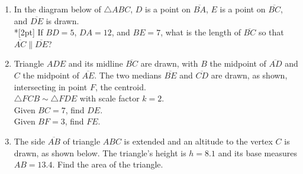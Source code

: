 \documentclass[12pt, twoside]{article}
\begin{document}
\begin{enumerate}
\newpage
  \item In the diagram below of $\triangle ABC$, $D$ is a point on $\overline{BA}$, $E$ is a point on $\overline{BC}$, and $\overline{DE}$ is drawn. \\*[2pt] 
  If $BD=5$, $DA=12$, and $BE=7$, what is the length of $\overline{BC}$ so that $\overline{AC} \parallel \overline{DE}$?
  \begin{flushright}
    \end{flushright} \vspace{1cm}
  
  \item Triangle $ADE$ and its midline $\overline{BC}$ are drawn, with $B$ the midpoint of $\overline{AD}$ and $C$ the midpoint of $\overline{AE}$. The two medians $\overline{BE}$ and $\overline{CD}$ are drawn, as shown, intersecting in point $F$, the centroid.\\[0.25cm]
  $\triangle FCB \sim \triangle FDE$ with scale factor $k=2$.\\[1cm]
  Given $BC=7$, find $DE$. \\[1cm] Given $BF=3$, find $FE$.
  \begin{flushright}
    \end{flushright} \vspace{1cm}
  
\newpage
  \item The side $\overline{AB}$ of triangle $ABC$ is extended and an altitude to the vertex $C$ is drawn, as shown below. The triangle's height is $h=8.1$ and its base measures $AB=13.4$. Find the area of the triangle.
    \begin{flushright}
    \end{flushright}
    

\end{enumerate}
\end{document}
